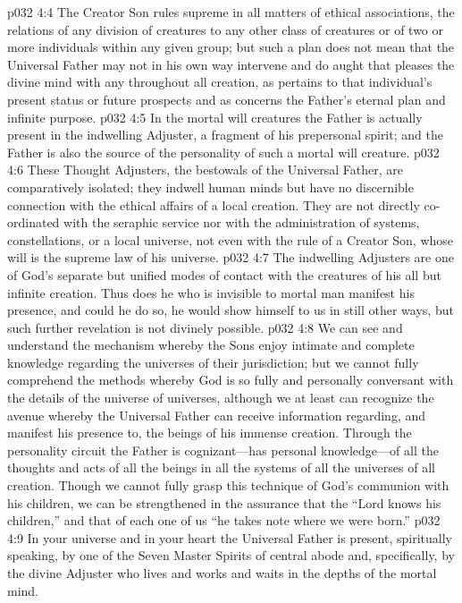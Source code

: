 \vs p032 4:4 The Creator Son rules supreme in all matters of ethical associations, the relations of any division of creatures to any other class of creatures or of two or more individuals within any given group; but such a plan does not mean that the Universal Father may not in his own way intervene and do aught that pleases the divine mind with any  throughout all creation, as pertains to that individual’s present status or future prospects and as concerns the Father’s eternal plan and infinite purpose.
\pc \vs p032 4:5 In the mortal will creatures the Father is actually present in the indwelling Adjuster, a fragment of his prepersonal spirit; and the Father is also the source of the personality of such a mortal will creature.
\pc \vs p032 4:6 These Thought Adjusters, the bestowals of the Universal Father, are comparatively isolated; they indwell human minds but have no discernible connection with the ethical affairs of a local creation. They are not directly co\hyp{}ordinated with the seraphic service nor with the administration of systems, constellations, or a local universe, not even with the rule of a Creator Son, whose will is the supreme law of his universe.
\vs p032 4:7 The indwelling Adjusters are one of God’s separate but unified modes of contact with the creatures of his all but infinite creation. Thus does he who is invisible to mortal man manifest his presence, and could he do so, he would show himself to us in still other ways, but such further revelation is not divinely possible.
\vs p032 4:8 We can see and understand the mechanism whereby the Sons enjoy intimate and complete knowledge regarding the universes of their jurisdiction; but we cannot fully comprehend the methods whereby God is so fully and personally conversant with the details of the universe of universes, although we at least can recognize the avenue whereby the Universal Father can receive information regarding, and manifest his presence to, the beings of his immense creation. Through the personality circuit the Father is cognizant---has personal knowledge---of all the thoughts and acts of all the beings in all the systems of all the universes of all creation. Though we cannot fully grasp this technique of God’s communion with his children, we can be strengthened in the assurance that the “Lord knows his children,” and that of each one of us “he takes note where we were born.”
\pc \vs p032 4:9 In your universe and in your heart the Universal Father is present, spiritually speaking, by one of the Seven Master Spirits of central abode and, specifically, by the divine Adjuster who lives and works and waits in the depths of the mortal mind.
